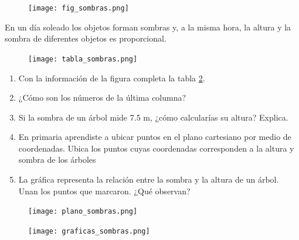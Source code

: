 \documentclass[11pt]{book}
\begin{document}
\begin{enumerate}
  \begin{minipage}[t]{0.3\textwidth}
    \begin{figure}[H]
      \centering
      \texttt{[image: fig\_sombras.png]}
      \label{fig:fig_sombras}
    \end{figure}
  \end{minipage}\hfill
  \begin{minipage}[t]{0.65\textwidth}
    \item En un día soleado los objetos forman sombras y, a la misma hora, la altura y la
    sombra de diferentes objetos es proporcional.
    \begin{flushright}
      \begin{figure}[H]
        \centering
        \texttt{[image: tabla\_sombras.png]}
        \label{tab:tabla_sombras}
      \end{figure}
    \end{flushright}
    \begin{enumerate}
      \item Con la información de la figura completa la tabla \ref{tab:tabla_sombras}.
      \item ¿Cómo son los números de la última columna?
      \item Si la sombra de un árbol mide 7.5 m, ¿cómo calcularías su altura? Explica.
      \item En primaria aprendiste a ubicar puntos en el plano cartesiano por medio de
            coordenadas. Ubica los puntos cuyas coordenadas corresponden a la altura y sombra de los árboles
      \item La gráfica representa la relación entre la sombra y la altura de un árbol. Unan los
            puntos que marcaron. ¿Qué observan?
    \end{enumerate}
  \end{minipage}

  \begin{figure}[H]
    \centering
    \texttt{[image: plano\_sombras.png]}
  \end{figure}

  \begin{figure}[H]
    \centering
    \texttt{[image: graficas\_sombras.png]}
    \label{fig:graficas_sombras}
  \end{figure}


\end{enumerate}
\end{document}

